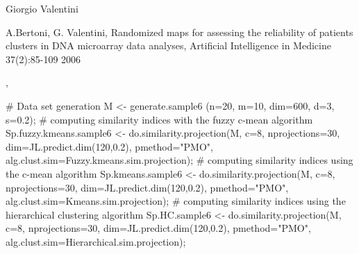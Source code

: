 \documentclass{article}
\begin{document}
\begin{Author}\relax
Giorgio Valentini 
\end{Author}
\begin{References}\relax
A.Bertoni, G. Valentini, Randomized maps for assessing the reliability of patients clusters in DNA microarray data analyses, 
Artificial Intelligence in Medicine 37(2):85-109  2006
\end{References}
\begin{SeeAlso}\relax
{}, 
\end{SeeAlso}
\begin{Examples}
\begin{ExampleCode}
# Data set generation
M <- generate.sample6 (n=20, m=10, dim=600, d=3, s=0.2);
# computing similarity indices with the fuzzy c-mean algorithm
Sp.fuzzy.kmeans.sample6 <- do.similarity.projection(M, c=8, nprojections=30, 
   dim=JL.predict.dim(120,0.2), pmethod="PMO", alg.clust.sim=Fuzzy.kmeans.sim.projection);
# computing similarity indices using the c-mean algorithm
Sp.kmeans.sample6 <- do.similarity.projection(M, c=8, nprojections=30, 
   dim=JL.predict.dim(120,0.2), pmethod="PMO", alg.clust.sim=Kmeans.sim.projection);
# computing similarity indices using the hierarchical clustering algorithm
Sp.HC.sample6 <- do.similarity.projection(M, c=8, nprojections=30, 
   dim=JL.predict.dim(120,0.2), pmethod="PMO", alg.clust.sim=Hierarchical.sim.projection);
\end{ExampleCode}
\end{Examples}
\end{document}
